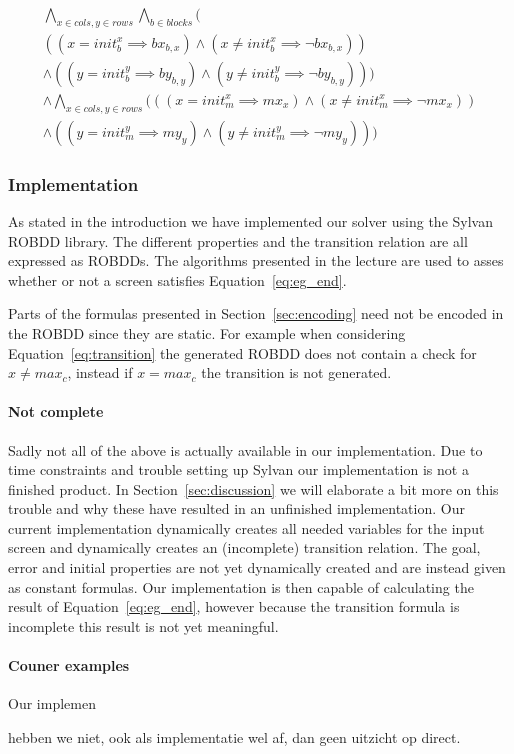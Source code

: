 \begin{multline} \label{eq:propInitial}
	\bigwedge_{x \in cols, y \in rows} \bigwedge_{b \in blocks} \bigg(\\  
		((x = init_b^x \implies bx_{b,x}) 
			\wedge (x \neq init_b^x \implies \neg bx_{b,x})) \\  
		\wedge ((y = init_b^y \implies by_{b,y}) 
			\wedge (y \neq init_b^y \implies \neg by_{b,y})) \bigg)\\  
	\wedge \bigwedge_{x \in cols, y \in rows} \Big(
		((x = init_m^x \implies mx_x) 
			\wedge (x \neq init_m^x \implies \neg mx_x)) \\  
		\wedge ((y = init_m^y \implies my_y) 
			\wedge (y \neq init_m^y \implies \neg my_y))
	\Big)
\end{multline}

\subsubsection{Implementation}
As stated in the introduction we have implemented our solver using the Sylvan
ROBDD library. The different properties and the transition relation are all
expressed as ROBDDs. The algorithms presented in the lecture are used to 
asses whether or not a screen satisfies Equation~\ref{eq:eg_end}.

Parts of the formulas presented in Section~\ref{sec:encoding} need not be 
encoded in the ROBDD since they are static. For example when considering
Equation~\ref{eq:transition} the generated ROBDD does not contain a check for 
$x \neq max_c$, instead if $x = max_c$ the transition is not generated. 

\paragraph{Not complete} Sadly not all of the above is actually available in our
implementation. Due to time constraints and trouble setting up Sylvan our 
implementation is not a finished product. In Section~\ref{sec:discussion} we
will elaborate a bit more on this trouble and why these have resulted in an
unfinished implementation. Our current implementation dynamically creates all
needed variables for the input screen and dynamically creates an (incomplete)
transition relation. The goal, error and initial properties are not yet 
dynamically created and are instead given as constant formulas. Our 
implementation is then capable of calculating the result of 
Equation~\ref{eq:eg_end}, however because the transition formula is incomplete 
this result is not yet meaningful. 

\paragraph{Couner examples} Our implemen

hebben we niet, ook als implementatie wel af, dan
geen uitzicht op direct.
